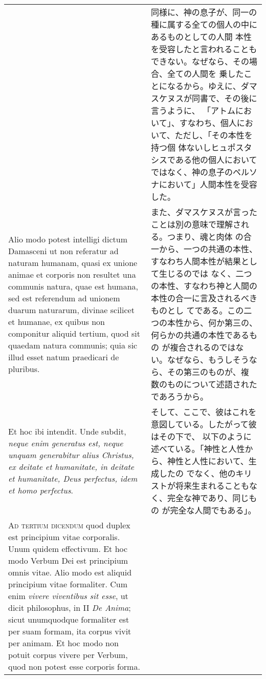 \documentclass[10pt]{jsarticle} %
\begin{document}
\begin{longtable}{p{21em}p{21em}}
&

同様に、神の息子が、同一の種に属する全ての個人の中にあるものとしての人間
 本性を受容したと言われることもできない。なぜなら、その場合、全ての人間を
 乗したことになるから。ゆえに、ダマスケヌスが同書で、その後に言うように、
 「アトムにおいて」、すなわち、個人において、ただし、「その本性を持つ個
 体ないしヒュポスタシスである他の個人においてではなく、神の息子のペルソ
 ナにおいて」人間本性を受容した。

\\


Alio modo potest intelligi dictum
Damasceni ut non referatur ad naturam humanam, quasi ex unione animae et
corporis non resultet una communis natura, quae est humana, sed est
referendum ad unionem duarum naturarum, divinae scilicet et humanae, ex
quibus non componitur aliquid tertium, quod sit quaedam natura communis;
quia sic illud esset natum praedicari de pluribus. 


&

また、ダマスケヌスが言ったことは別の意味で理解される。つまり、魂と肉体
 の合一から、一つの共通の本性、すなわち人間本性が結果として生じるのでは
 なく、二つの本性、すなわち神と人間の本性の合一に言及されるべきものとし
 てである。この二つの本性から、何か第三の、何らかの共通の本性であるもの
 が複合されるのではない。なぜなら、もうしそうなら、その第三のものが、複
 数のものについて述語されたであろうから。


\\


Et hoc ibi
intendit. Unde subdit, {\itshape neque enim generatus est, neque unquam
generabitur alius Christus, ex deitate et humanitate, in deitate et
humanitate, Deus perfectus, idem et homo perfectus}.


&

そして、ここで、彼はこれを意図している。したがって彼はその下で、
以下のように述べている。「神性と人性から、神性と人性において、生成したの
 でなく、他のキリストが将来生まれることもなく、完全な神であり、同じもの
 が完全な人間でもある」。





\\



{\scshape Ad tertium dicendum} quod duplex est principium vitae corporalis. Unum
quidem effectivum. Et hoc modo Verbum Dei est principium omnis
vitae. Alio modo est aliquid principium vitae formaliter. Cum enim
{\itshape vivere viventibus sit esse}, ut dicit philosophus, in II {\itshape De Anima}; sicut
unumquodque formaliter est per suam formam, ita corpus vivit per
animam. Et hoc modo non potuit corpus vivere per Verbum, quod non potest
esse corporis forma.



\end{longtable}
\end{document}
